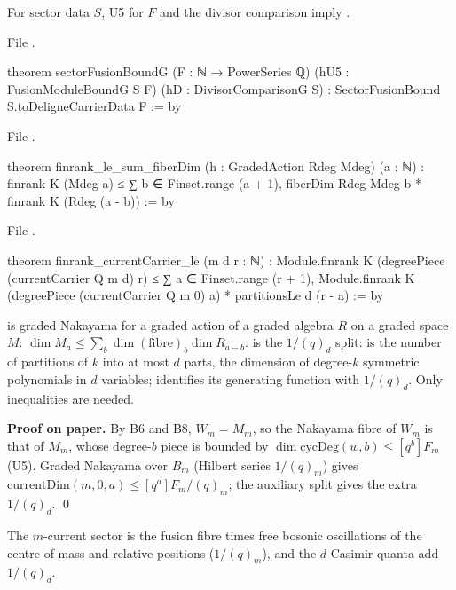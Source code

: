 \begin{theorem}\label{l24:thm:sfb}
For sector data $S$, U5 for $F$ and the divisor comparison imply .
\end{theorem}
\noindent File .
\begin{leancode}
theorem sectorFusionBoundG (F : ℕ → PowerSeries ℚ) (hU5 : FusionModuleBoundG S F)
    (hD : DivisorComparisonG S) : SectorFusionBound S.toDeligneCarrierData F := by
\end{leancode}
\noindent File .
\begin{leancode}
theorem finrank_le_sum_fiberDim (h : GradedAction Rdeg Mdeg) (a : ℕ) :
    finrank K (Mdeg a) ≤
      ∑ b ∈ Finset.range (a + 1), fiberDim Rdeg Mdeg b * finrank K (Rdeg (a - b)) := by
\end{leancode}
\noindent File .
\begin{leancode}
theorem finrank_currentCarrier_le (m d r : ℕ) :
    Module.finrank K (degreePiece (currentCarrier Q m d) r) ≤
      ∑ a ∈ Finset.range (r + 1),
        Module.finrank K (degreePiece (currentCarrier Q m 0) a) * partitionsLe d (r - a) := by
\end{leancode}

\begin{dictionary}
 is graded Nakayama for a graded action of a graded algebra $R$ on a graded space
$M$: $\dim M_a\le\sum_b\dim(\text{fibre})_b\dim R_{a-b}$.  is the $1/(q)_d$ split:
 is the number of partitions of $k$ into at most $d$ parts, the dimension of degree-$k$
symmetric polynomials in $d$ variables;  identifies its generating function with
$1/(q)_d$. Only inequalities are needed.
\end{dictionary}

\textbf{Proof on paper.} By B6 and B8, $W_m=M_m$, so the Nakayama fibre of $W_m$ is that of $M_m$, whose degree-$b$
piece is bounded by $\dim\mathrm{cycDeg}(w,b)\le[q^b]F_m$ (U5). Graded Nakayama over $B_m$ (Hilbert series $1/(q)_m$) gives
$\mathrm{currentDim}(m,0,a)\le[q^a]F_m/(q)_m$; the auxiliary split gives the extra $1/(q)_d$. \qed

\begin{physics}
The $m$-current sector is the fusion fibre times free bosonic oscillations of the centre of mass and relative
positions ($1/(q)_m$), and the $d$ Casimir quanta add $1/(q)_d$.
\end{physics}

